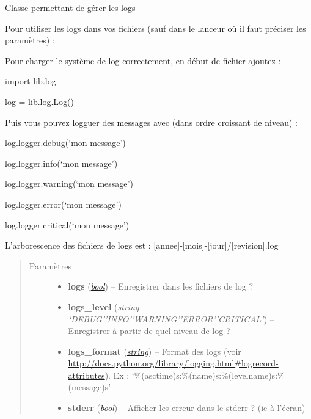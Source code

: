 \documentclass[letterpaper,10pt,french]{sphinxmanual}
\begin{document}
\begin{fulllineitems}
\label{log:lib.log.Log}
Classe permettant de gérer les logs

Pour utiliser les logs dans vos fichiers (sauf dans le lanceur où il faut préciser les paramètres) :

Pour charger le système de log correctement, en début de fichier ajoutez :

import lib.log

log = lib.log.Log()

Puis vous pouvez logguer des messages avec (dans ordre croissant de niveau) :

log.logger.debug(`mon message')

log.logger.info(`mon message')

log.logger.warning(`mon message')

log.logger.error(`mon message')

log.logger.critical(`mon message')

L'arborescence des fichiers de logs est : {[}annee{]}-{[}mois{]}-{[}jour{]}/{[}revision{]}.log
\begin{quote}\begin{description}
\item[{Paramètres}] \leavevmode\begin{itemize}
\item {} 
\textbf{logs} (\href{http://docs.python.org/library/functions.html\#bool}{\emph{bool}}) -- Enregistrer dans les fichiers de log ?

\item {} 
\textbf{logs\_level} (\emph{string `DEBUG'\textbar{}'INFO'\textbar{}'WARNING'\textbar{}'ERROR'\textbar{}'CRITICAL'}) -- Enregistrer à partir de quel niveau de log ?

\item {} 
\textbf{logs\_format} (\href{http://docs.python.org/library/string.html\#module-string}{\emph{string}}) -- Format des logs (voir \href{http://docs.python.org/library/logging.html\#logrecord-attributes}{http://docs.python.org/library/logging.html\#logrecord-attributes}). Ex : `\%(asctime)s:\%(name)s:\%(levelname)s:\%(message)s'

\item {} 
\textbf{stderr} (\href{http://docs.python.org/library/functions.html\#bool}{\emph{bool}}) -- Afficher les erreur dans le stderr ? (ie à l'écran)


\end{itemize}
\end{description}
\end{quote}
\end{fulllineitems}
\end{document}
